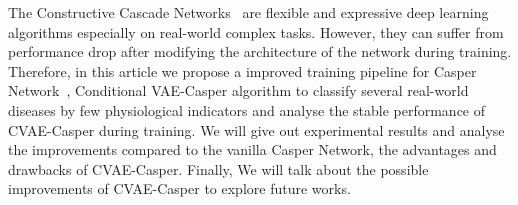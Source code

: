 The Constructive Cascade Networks~\cite{GeneralisationConstructiveCascade2009} are flexible and expressive deep learning algorithms especially on real-world complex tasks. However, they can suffer from performance drop after modifying the architecture of the network during training. Therefore, in this article we propose a improved training pipeline for Casper Network~\cite{CascadeCorrelation1990}, Conditional VAE-Casper algorithm to classify several real-world diseases by few physiological indicators and analyse the stable performance of CVAE-Casper during training. We will give out experimental results and analyse the improvements compared to the vanilla Casper Network, the advantages and drawbacks of CVAE-Casper. Finally, We will talk about the possible improvements of CVAE-Casper to explore future works.
